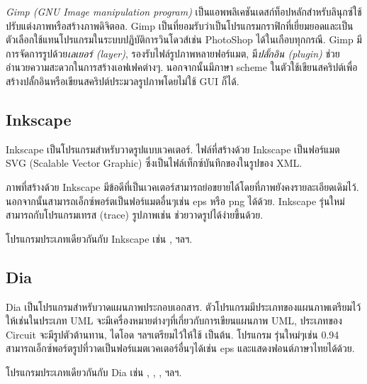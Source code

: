 \begin{thwbr}
\emph{Gimp (GNU Image manipulation program)} เป็นแอพพลิเคชันเดสก์ท็อปหลักสำหรับลินุกซ์ใช้ปรับแต่งภาพหรือสร้างภาพดิจิตอล. Gimp เป็นที่ยอมรับว่าเป็นโปรแกรมกราฟิกที่เยี่ยมยอดและเป็นตัวเลือกใช้แทนโปรแกรมในระบบปฏิบัติการวินโดวส์เช่น PhotoShop ได้ในเกือบทุกกรณี. Gimp มีการจัดการรูปด้วย\emph{เลเยอร์ (layer)}, รองรับไฟล์รูปภาพหลายฟอร์แมต, มี\emph{ปลั้กอิน (plugin)} ช่วยอำนวยความสะดวกในการสร้างเอฟเฟคต่างๆ. นอกจากนั้นมีภาษา scheme ในตัวใช้เขียนสคริปต์เพื่อสร้างปลั้กอินหรือเขียนสคริปต์ประมวลรูปภาพโดยไม่ใช้ GUI ก็ได้.

\subsection{Inkscape}
\begin{figure}[!hbt]
\end{figure}


Inkscape เป็นโปรแกรมสำหรับวาดรูปแบบเวคเตอร์. ไฟล์ที่สร้างด้วย Inkscape เป็นฟอร์แมต SVG (Scalable Vector Graphic) ซึ่งเป็นไฟล์เท็กซ์บันทึกของในรูปของ XML. 

ภาพที่สร้างด้วย Inkscape มีข้อดีที่เป็นเวคเตอร์สามารถย่อขยายได้โดยที่ภาพยังคงรายละเอียดเดิมไว้. นอกจากนั้นสามารถเอ็กซ์พอร์ตเป็นฟอร์แมตอื่นๆเช่น eps หรือ png ได้ด้วย. Inkscape รุ่นใหม่สามารถกับโปรแกรมเทรส (trace) รูปภาพเช่น  ช่วยวาดรูปได้ง่ายขึ้นด้วย.

โปรแกรมประเภทเดียวกันกับ Inkscape เช่น ,  ฯลฯ.

\subsection{Dia}
\begin{figure}[!hbt]
\end{figure}

Dia เป็นโปรแกรมสำหรับวาดแผนภาพประกอบเอกสาร. ตัวโปรแกรมมีประเภทของแผนภาพเตรียมไว้ให้เช่นในประเภท UML จะมีเครื่องหมายต่างๆที่เกี่ยวกับการเขียนแผนภาพ UML, ประเภทของ Circuit จะมีรูปตัวต้านทาน, ไดโอด ฯลฯเตรียมไว้ให้ใช้ เป็นต้น. โปรแกรม รุ่นใหม่ๆเช่น 0.94 สามารถเอ็กซ์พอร์ตรูปที่วาดเป็นฟอร์แมตเวคเตอร์อื่นๆได้เช่น eps และแสดงฟอนต์ภาษาไทยได้ด้วย.

โปรแกรมประเภทเดียวกันกับ Dia เช่น , , ,  ฯลฯ.


\end{thwbr}
